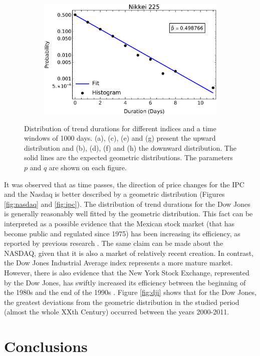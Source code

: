 \documentclass[a4paper]{jpconf}
\begin{document}
\begin{figure}[h!tb]
\begin{subfigure}[b]{0.45\textwidth}
            \includegraphics[width=\textwidth]{img/dist_neg_Nikkei.eps}
            \caption[]{}      
        \end{subfigure}
        \caption{\small Distribution of trend durations for different indices and a time windows of 1000 days. (a), (c), (e) and (g) present the upward distribution and (b), (d), (f) and (h) the downward distribution. The solid lines are the expected geometric distributions. The parameters $p$ and $q$ are shown on each figure.} 
	\label{fig:oneGT}
\end{figure}

It was observed that as time passes, the direction of price changes for the IPC and the Nasdaq is better described by a geometric distribution (Figures \ref{fig:nasdaq} and \ref{fig:ipc}). The distribution of trend durations for the Dow Jones is generally reasonably well fitted by the geometric distribution. This fact can be interpreted as a possible evidence that the Mexican stock market (that has become public and regulated since 1975) has been increasing its efficiency, as reported by previous research \cite{Achach}. The same claim can be made about the NASDAQ, given that it is also a market of relatively recent creation. In contrast, the Dow Jones Industrial Average index represents a more mature market. However, there is also evidence that the New York Stock Exchange, represented by the Dow Jones, has swiftly increased its efficiency between the beginning of the 1980s and the end of the 1990s \cite{NYSE}. Figure \ref{fig:dji} shows that for the Dow Jones, the greatest deviations from the geometric distribution in the studied period (almost the whole XXth Century) occurred between the years 2000-2011.


\section{Conclusions}
\end{document}
